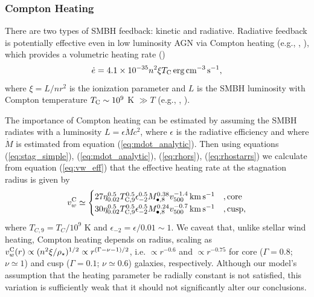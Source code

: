 \documentclass[usenatbib,fleqn]{mn2e}
\newcommand{\densSlope}{\nu}
\begin{document}
\subsubsection{Compton Heating}

There are two types of SMBH feedback: kinetic and radiative.
Radiative feedback is potentially effective even in low luminosity AGN
via Compton heating (e.g., \citealt{Sazonov+04}, \citealt{Ciotti+10}),
which provides a volumetric heating rate (\citealt{Gan+14})
\begin{align}
\dot{e} = 4.1\times 10^{-35}n^{2}\xi T_{\rm C}\,{\rm erg\,cm^{-3}\,s^{-1}},
\end{align}
where $\xi = L/n r^{2}$ is the ionization parameter and $L$ is the SMBH luminosity with Compton temperature $T_{\rm C} \sim 10^{9}$ K $\gg T$ (e.g., \citealt{Ho99}, \citealt{Eracleous+10}).  

The importance of Compton heating can be estimated by assuming the SMBH
radiates with a luminosity $L = \epsilon \dot{M}c^{2}$, where
$\epsilon$ is the radiative efficiency and where $\dot{M}$ is
estimated from equation (\ref{eq:mdot_analytic}).  Then using
equations (\ref{eq:stag_simple}), (\ref{eq:mdot_analytic}),
(\ref{eq:rhors}), (\ref{eq:rhostarrs}) we calculate from equation
(\ref{eq:vw_eff}) that the effective heating rate at the stagnation radius is given by
\begin{align} v_{w}^{\rm C} \simeq
  \begin{cases} 27 \eta_{0.02}^{0.5}T_{\rm
C,9}^{0.5}\epsilon_{-2}^{0.5} M_{\bullet,8}^{0.38}v_{500}^{-1.4}\,{\rm
km\,s^{-1}} &, \text{core}\\ 30 \eta_{0.02}^{0.5}T_{\rm
C,9}^{0.5}\epsilon_{-2}^{0.5} M_{\bullet,8}^{0.24}v_{500}^{-0.7}\,{\rm
km\,s^{-1}} &, \text{cusp},
  \end{cases}
  \label{eq:vC}
\end{align} where $T_{C,9} = T_{C}/10^{9}$ K and $\epsilon_{-2} =
\epsilon/0.01 \sim 1$.  We caveat that, unlike stellar wind heating,
Compton heating depends on radius, scaling as $v_{w}^{\rm C}(r)
\propto (n^{2}\xi/\rho_{\star})^{1/2} \propto
r^{(\Gamma-\densSlope-1)/2}$, i.e. $\propto r^{-0.6}$ and $\propto
r^{-0.75}$ for core ($\Gamma = 0.8$; $\densSlope \simeq 1$) and cusp
($\Gamma = 0.1$; $\densSlope \simeq 0.6$) galaxies, respectively.  Although our
model's assumption that the heating parameter be radially constant is
not satisfied, this variation is sufficiently weak that it should
not significantly alter our conclusions.
\end{document}
